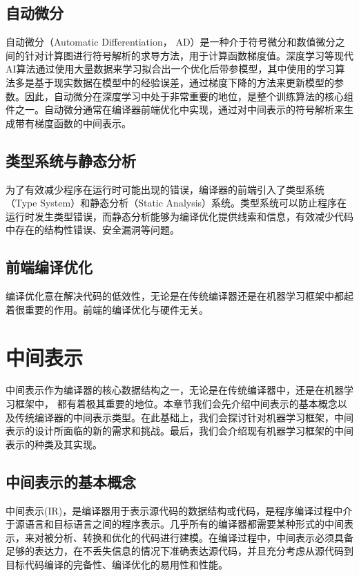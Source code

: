 \documentclass[letterpaper,10pt,english]{sphinxmanual}
\begin{document}
\subsection{自动微分}
\label{\detokenize{chapter_frontend_and_ir/overview_of_frontend:id3}}
\sphinxAtStartPar
自动微分（Automatic Differentiation，
AD）是一种介于符号微分和数值微分之间的针对计算图进行符号解析的求导方法，用于计算函数梯度值。深度学习等现代AI算法通过使用大量数据来学习拟合出一个优化后带参模型，其中使用的学习算法多是基于现实数据在模型中的经验误差，通过梯度下降的方法来更新模型的参数。因此，自动微分在深度学习中处于非常重要的地位，是整个训练算法的核心组件之一。自动微分通常在编译器前端优化中实现，通过对中间表示的符号解析来生成带有梯度函数的中间表示。


\subsection{类型系统与静态分析}
\label{\detokenize{chapter_frontend_and_ir/overview_of_frontend:id4}}
\sphinxAtStartPar
为了有效减少程序在运行时可能出现的错误，编译器的前端引入了类型系统（Type
System）和静态分析（Static
Analysis）系统。类型系统可以防止程序在运行时发生类型错误，而静态分析能够为编译优化提供线索和信息，有效减少代码中存在的结构性错误、安全漏洞等问题。


\subsection{前端编译优化}
\label{\detokenize{chapter_frontend_and_ir/overview_of_frontend:id5}}
\sphinxAtStartPar
编译优化意在解决代码的低效性，无论是在传统编译器还是在机器学习框架中都起着很重要的作用。前端的编译优化与硬件无关。


\section{中间表示}
\label{\detokenize{chapter_frontend_and_ir/intermediate_representation:id1}}\label{\detokenize{chapter_frontend_and_ir/intermediate_representation::doc}}
\sphinxAtStartPar
中间表示作为编译器的核心数据结构之一，无论是在传统编译器中，还是在机器学习框架中，
都有着极其重要的地位。本章节我们会先介绍中间表示的基本概念以及传统编译器的中间表示类型。在此基础上，我们会探讨针对机器学习框架，中间表示的设计所面临的新的需求和挑战。最后，我们会介绍现有机器学习框架的中间表示的种类及其实现。


\subsection{中间表示的基本概念}
\label{\detokenize{chapter_frontend_and_ir/intermediate_representation:id2}}
\sphinxAtStartPar
中间表示(IR)，是编译器用于表示源代码的数据结构或代码，是程序编译过程中介于源语言和目标语言之间的程序表示。几乎所有的编译器都需要某种形式的中间表示，来对被分析、转换和优化的代码进行建模。在编译过程中，中间表示必须具备足够的表达力，在不丢失信息的情况下准确表达源代码，并且充分考虑从源代码到目标代码编译的完备性、编译优化的易用性和性能。
\end{document}
